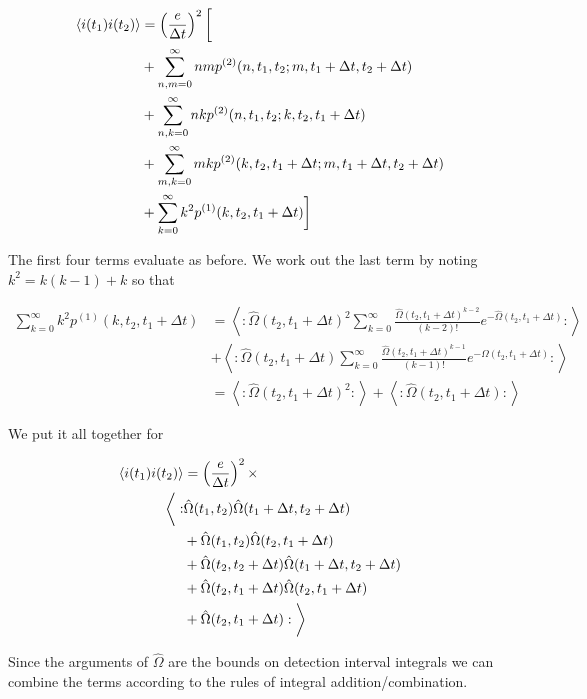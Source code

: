 \documentclass[12pt]{article}
\begin{document}
\begin{align}
\braket{i(t_1)i(t_2)} &= \left(\frac{e}{\Delta t}\right)^2\bigg[ \\
&+ \sum_{n,m=0}^{\infty} nm p^{(2)}(n,t_1, t_2;m,t_1+\Delta t, t_2+\Delta t)\\
&+ \sum_{n,k=0}^{\infty} nk p^{(2)}(n,t_1, t_2;k, t_2,t_1+\Delta t)\\
&+ \sum_{m,k=0}^{\infty} mk p^{(2)}(k,t_2,t_1+\Delta t;m,t_1+\Delta t, t_2+\Delta t)\\
&+\sum_{k=0}^{\infty} k^2 p^{(1)}(k,t_2,t_1+\Delta t) \bigg]
\end{align}

The first four terms evaluate as before. We work out the last term by noting $k^2 = k(k-1)+k$ so that

\begin{align}
\sum_{k=0}^{\infty} k^2 p^{(1)}(k,t_2,t_1+\Delta t) &=\left<: \hat{\Omega}(t_2,t_1+\Delta t)^2 \sum_{k=0}^{\infty} \frac{\hat{\Omega}(t_2,t_1+\Delta t)^{k-2}}{(k-2)!} e^{-\hat{\Omega}(t_2,t_1+\Delta t)} :\right> \\
&+ \left<:\hat{\Omega}(t_2,t_1+\Delta t) \sum_{k=0}^{\infty} \frac{\hat{\Omega}(t_2,t_1+\Delta t)^{k-1}}{(k-1)!} e^{-\hat{\Omega}(t_2,t_1+\Delta t)}:\right>\\
& = \left<:\hat{\Omega}(t_2,t_1+\Delta t)^2:\right> + \left<:\hat{\Omega}(t_2,t_1+\Delta t):\right>
\end{align}

We put it all together for

\begin{align}
\braket{i(t_1)i(t_2)} &= \left(\frac{e}{\Delta t}\right)^2 \times \\
\bigg<: &\hat{\Omega}(t_1, t_2)\hat{\Omega}(t_1+\Delta t, t_2+\Delta t)\\
&+ \hat{\Omega}(t_1, t_2)\hat{\Omega}( t_2,t_1+\Delta t) \\
&+ \hat{\Omega}(t_2,t_2+\Delta t) \hat{\Omega}(t_1+\Delta t, t_2+\Delta t) \\
&+ \hat{\Omega}(t_2,t_1+\Delta t) \hat{\Omega}(t_2,t_1+\Delta t)\\
&+ \hat{\Omega}(t_2,t_1+\Delta t) :\bigg>
\end{align}

Since the arguments of $\hat{\Omega}$ are the bounds on detection interval integrals we can combine the terms according to the rules of integral addition/combination.
\end{document}
